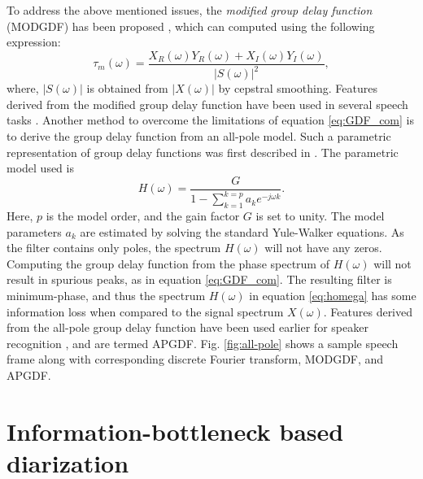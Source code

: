 \documentclass[conference]{IEEEtran}
\begin{document}
To address the above mentioned issues, the
\textit{modified group delay function} (MODGDF) has been proposed
\cite{modifiedGD}, which can
computed using the following expression:
\begin{equation}
\tau_{m}(\omega) =  
\frac{X_R(\omega)Y_R(\omega) + X_I(\omega)Y_I(\omega)}{|S(\omega)|^2}, 
\label{eq:MODGDF}
\end{equation}
where, $|S(\omega)|$ is obtained from $|X(\omega)|$ by cepstral smoothing.
Features derived from the modified group delay function have been used in
several speech tasks \cite{modifiedGD}.
Another method to overcome the limitations of equation \ref{eq:GDF_com} is to
derive the group delay function from an all-pole model. Such a parametric
representation of group delay functions was first described in \cite{yegnaJASA}.
The parametric model used is
\begin{equation}
H(\omega) =  \frac{G}{1 - \sum_{k=1}^{k = p} a_k e^{-j\omega k}}.
\label{eq:homega}
\end{equation}
Here, $p$ is the model order, and the gain factor $G$ is set to unity. The model
parameters $a_k$ are estimated by solving the standard Yule-Walker equations. As
the filter contains only poles, the spectrum $H(\omega)$ will not have any
zeros.  Computing the group delay function from the phase spectrum of
$H(\omega)$ will not result in spurious peaks, as in equation \ref{eq:GDF_com}.
The resulting filter is minimum-phase, and thus the spectrum $H(\omega)$ in
equation \ref{eq:homega} has some information loss when compared to the signal
spectrum $X(\omega)$. Features derived from the all-pole group delay function
have been used earlier for speaker recognition \cite{allPoleGdSid}, and are
termed APGDF. Fig. \ref{fig:all-pole} 
shows a sample speech frame along with corresponding discrete Fourier transform, MODGDF, and APGDF. 

\section{Information-bottleneck based diarization}
\label{system}

\end{document}
